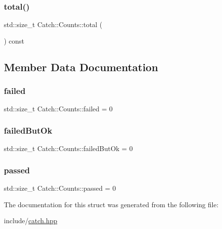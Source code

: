 \mbox{\label{struct_catch_1_1_counts_a94f969c09cf52d1339c085c9603cd1d3}} 
\subsubsection{\texorpdfstring{total()}{total()}}
{\footnotesize\ttfamily std\+::size\+\_\+t Catch\+::\+Counts\+::total (\begin{DoxyParamCaption}{ }\end{DoxyParamCaption}) const}



\subsection{Member Data Documentation}
\mbox{\label{struct_catch_1_1_counts_a19982a3817a3bc2c07f0290e71f497a3}} 
\subsubsection{\texorpdfstring{failed}{failed}}
{\footnotesize\ttfamily std\+::size\+\_\+t Catch\+::\+Counts\+::failed = 0}

\mbox{\label{struct_catch_1_1_counts_ac090973a2ff51394cd452718e75c073e}} 
\subsubsection{\texorpdfstring{failedButOk}{failedButOk}}
{\footnotesize\ttfamily std\+::size\+\_\+t Catch\+::\+Counts\+::failed\+But\+Ok = 0}

\mbox{\label{struct_catch_1_1_counts_ad28daaf3de28006400208b6dd0c631e6}} 
\subsubsection{\texorpdfstring{passed}{passed}}
{\footnotesize\ttfamily std\+::size\+\_\+t Catch\+::\+Counts\+::passed = 0}



The documentation for this struct was generated from the following file\+:\begin{DoxyCompactItemize}
\item 
include/\mbox{\hyperlink{catch_8hpp}{catch.\+hpp}}\end{DoxyCompactItemize}
